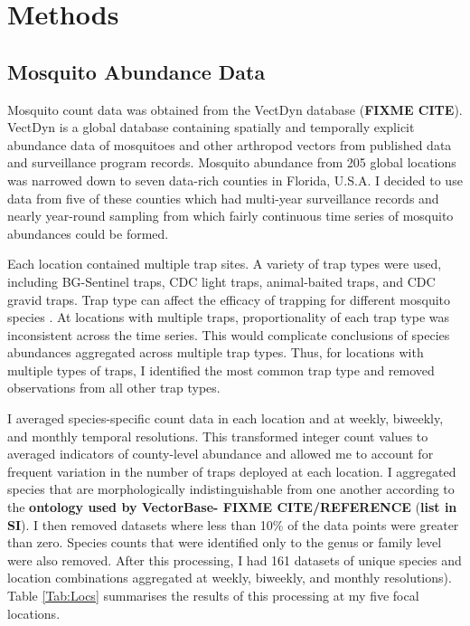 \section{Methods}

\subsection{Mosquito Abundance Data}

Mosquito count data was obtained from the VectDyn database (\textbf{FIXME CITE}). VectDyn is a global database containing spatially and temporally explicit abundance data of mosquitoes and other arthropod vectors from published data and surveillance program records. Mosquito abundance from 205 global locations was narrowed down to seven data-rich counties in Florida, U.S.A. I decided to use data from five of these counties which had multi-year surveillance records and nearly year-round sampling from which fairly continuous time series of mosquito abundances could be formed. 

Each location contained multiple trap sites. A variety of trap types were used, including BG-Sentinel traps, CDC light traps, animal-baited traps, and CDC gravid traps. Trap type can affect the efficacy of trapping for different mosquito species \citep{Li2016}. At locations with multiple traps, proportionality of each trap type was inconsistent across the time series. This would complicate conclusions of species abundances aggregated across multiple trap types. Thus, for locations with multiple types of traps, I identified the most common trap type and removed observations from all other trap types. 


I averaged species-specific count data in each location and at weekly, biweekly, and monthly temporal resolutions. This transformed integer count values to averaged indicators of county-level abundance and allowed me to account for frequent variation in the number of traps deployed at each location. I aggregated species that are morphologically indistinguishable from one another according to the \textbf{ontology used by VectorBase- FIXME CITE/REFERENCE} (\textbf{list in SI}). I then removed datasets where less than 10\% of the data points were greater than zero. Species counts that were identified only to the genus or family level were also removed. After this processing, I had 161 datasets of unique species and location combinations aggregated at weekly, biweekly, and monthly resolutions). Table \ref{Tab:Locs} summarises the results of this processing at my five focal locations.

